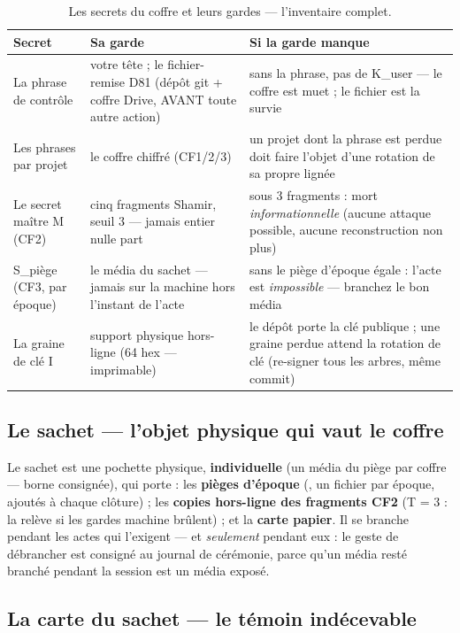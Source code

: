 \begin{table}[htbp]
\centering\small
\caption{Les secrets du coffre et leurs gardes — l'inventaire complet.}
\label{tab:inventaire}
\begin{tabularx}{\textwidth}{@{}l Y Y@{}}
\toprule
\textbf{Secret} & \textbf{Sa garde} & \textbf{Si la garde manque} \\
\midrule
La phrase de contrôle & votre tête ; le fichier-remise D81 (dépôt git + coffre Drive,
AVANT toute autre action) & sans la phrase, pas de K\_user — le coffre est muet ; le
fichier est la survie \\
Les phrases par projet & le coffre chiffré (CF1/2/3) & un projet dont la phrase est
perdue doit faire l'objet d'une rotation de sa propre lignée \\
Le secret maître M (CF2) & cinq fragments Shamir, seuil 3 — jamais entier nulle part &
sous 3 fragments : mort \emph{informationnelle} (aucune attaque possible, aucune
reconstruction non plus) \\
S\_piège (CF3, par époque) & le média du sachet — jamais sur la machine hors l'instant
de l'acte & sans le piège d'époque égale : l'acte est \emph{impossible} — branchez le
bon média \\
La graine de clé I & support physique hors-ligne (64 hex — imprimable) & le dépôt
porte la clé publique ; une graine perdue attend la rotation de clé (re-signer tous
les arbres, même commit) \\
\bottomrule
\end{tabularx}
\end{table}

\subsection{Le sachet — l'objet physique qui vaut le coffre}

Le sachet est une pochette physique, \textbf{individuelle} (un média du piège par
coffre — borne consignée), qui porte : les \textbf{pièges d'époque}
(, un fichier par époque, ajoutés à chaque clôture) ; les
\textbf{copies hors-ligne des fragments CF2} (T = 3 : la relève si les gardes machine
brûlent) ; et la \textbf{carte papier}. Il se branche pendant les actes qui l'exigent —
et \emph{seulement} pendant eux : le geste de débrancher est consigné au journal de
cérémonie, parce qu'un média resté branché pendant la session est un média exposé.

\subsection{La carte du sachet — le témoin indécevable}

